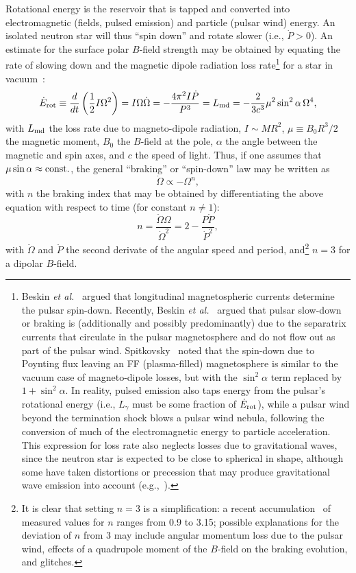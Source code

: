 \documentclass{PoS}
\newcommand{\beq}{\begin{equation}}
\newcommand{\eeq}{\end{equation}}
\begin{document}
Rotational energy is the reservoir that is tapped and converted into electromagnetic (fields, pulsed emission) and particle (pulsar wind) energy. An isolated neutron star will thus ``spin down'' and rotate slower (i.e., $\dot{P}>0$). An estimate for the surface polar $B$-field strength may be obtained by equating the rate of slowing down and the magnetic dipole radiation loss rate\footnote{Beskin \textit{et al.}~\cite{Beskin83} argued that longitudinal magnetospheric currents determine the pulsar spin-down. Recently, Beskin \textit{et al.}~\cite{Beskin17} argued that pulsar slow-down or braking is (additionally and possibly predominantly) due to the separatrix currents that circulate in the pulsar magnetosphere and do not flow out as part of the pulsar wind. Spitkovsky~\cite{Spitkovsky2006} noted that the spin-down due to Poynting flux leaving an FF (plasma-filled) magnetosphere is similar to the vacuum case of magneto-dipole losses, but with the $\sin^2\alpha$ term replaced by $1+\sin^2\alpha$. In reality, pulsed emission also taps energy from the pulsar's rotational energy (i.e., $L_\gamma$ must be some fraction of $\dot{E}_{\rm rot}$), while a pulsar wind beyond the termination shock blows a pulsar wind nebula, following the conversion of much of the electromagnetic energy to particle acceleration. This expression for loss rate also neglects losses due to gravitational waves, since the neutron star is expected to be close to spherical in shape, although some have taken distortions or precession that may produce gravitational wave emission into account (e.g.,~\cite{Pandharipande76,Bonazzola96,Zimmerman80}).} for a star in vacuum~\cite{Ostriker69}:
\beq
\dot{E}_{\rm rot}\equiv\frac{d}{dt}\left(\frac{1}{2}I\Omega^2\right) = I\Omega\dot{\Omega} = -\frac{4\pi^2I\dot{P}}{P^3}=L_{\rm md}= -\frac{2}{3c^3}\mu^2\sin^2\alpha\,\Omega^4,\label{eq:dipole_loss}
\eeq
with $L_{\rm md}$ the loss rate due to magneto-dipole radiation, $I\sim MR^2$, $\mu \equiv B_0R^3/2$ the magnetic moment, $B_0$ the $B$-field at the pole, $\alpha$ the angle between the magnetic and spin axes, and $c$ the speed of light. Thus, if one assumes that $\mu\sin\alpha\approx {\rm const.}$, the general ``braking'' or ``spin-down'' law may be written as
\beq
\dot{\Omega} \propto -\Omega^n,\label{eq:law}
\eeq
with $n$ the braking index that may be obtained by differentiating the above equation with respect to time (for constant $n\neq1$):
\beq
n = \frac{\ddot{\Omega}\Omega}{\dot{\Omega}^2} = 2 - \frac{P\ddot{P}}{\dot{P}^2},
\eeq
with $\ddot{\Omega}$ and $\ddot{P}$ the second derivate of the angular speed and period, and\footnote{It is clear that setting $n=3$ is a simplification: a recent accumulation~\cite{Archibald16} of measured values for $n$ ranges from 0.9 to 3.15; possible explanations for the deviation of $n$ from 3 may include angular momentum loss due to the pulsar wind, effects of a quadrupole moment of the $B$-field on the braking evolution, and glitches.} $n=3$ for a dipolar $B$-field.
\end{document}
